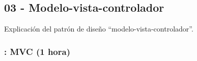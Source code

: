 \documentclass[a4paper,12pt]{article}
\begin{document}




\subsection{03 - Modelo-vista-controlador}

Explicación del patrón de diseño ``modelo-vista-controlador''.

\subsubsection{\juevesH: MVC (1 hora)}
\label{cal:juevesH}
\end{document}
